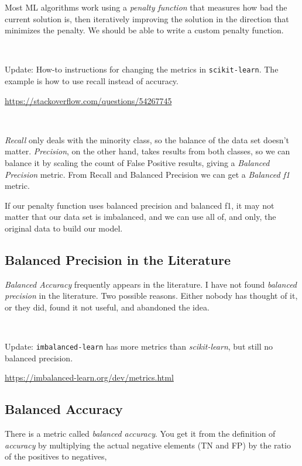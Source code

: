 Most ML algorithms work using a {\it penalty function} that measures how bad the current solution is, then iteratively improving the solution in the direction that minimizes the penalty.  We should be able to write a custom penalty function.  

\

Update:  How-to instructions for changing the metrics in {\tt scikit-learn}.  The example is how to use recall instead of accuracy.  

\url{https://stackoverflow.com/questions/54267745}


\

{\it Recall} only deals with the minority class, so the balance of the data set doesn't matter.  {\it Precision}, on the other hand, takes results from both classes, so we can balance it by scaling the count of False Positive results, giving a {\it Balanced Precision} metric.  From Recall and Balanced Precision we can get a {\it Balanced f1} metric.  

If our penalty function uses balanced precision and balanced f1, it may not matter that our data set is imbalanced, and we can use all of, and only, the original data to build our model.  

\subsection{Balanced Precision in the Literature}

{\it Balanced Accuracy} frequently appears in the literature.  I have not found {\it balanced precision} in the literature.  Two possible reasons.  Either nobody has thought of it, or they did, found it not useful, and abandoned the idea.

\

Update:  {\tt imbalanced-learn} has more metrics than {\it scikit-learn}, but still no balanced precision.  

\url{https://imbalanced-learn.org/dev/metrics.html}



\subsection{Balanced Accuracy}

There is a metric called {\it balanced accuracy}.  You get it from the definition of {\it accuracy} by multiplying the actual negative elements (TN and FP) by the ratio of the positives to negatives, 

